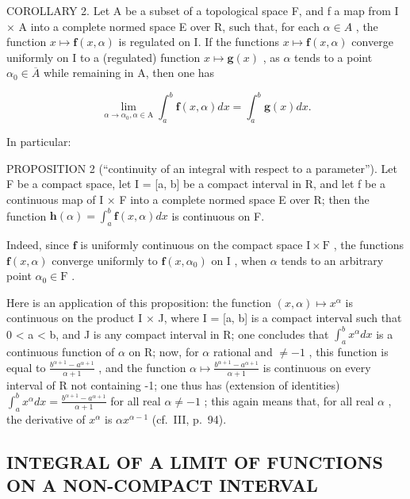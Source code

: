 COROLLARY 2. Let A be a subset of a topological space F, and f a map from I × A into a complete normed space E over R, such that, for each \(\alpha \in A\) , the function \(x \mapsto \mathbf{f}(x, \alpha)\) is regulated on I. If the functions \(x \mapsto \mathbf{f}(x, \alpha)\) converge uniformly on I to a (regulated) function \(x \mapsto \mathbf{g}(x)\) , as \(\alpha\) tends to a point \(\alpha_{0} \in \overline{A}\) while remaining in A, then one has

\[
\lim _ {\alpha \rightarrow \alpha_ {0}, \alpha \in \mathrm{A}} \int_ {a} ^ {b} \mathbf {f} (x, \alpha) d x = \int_ {a} ^ {b} \mathbf {g} (x) d x.\tag{3}
\]

In particular:

PROPOSITION 2 (``continuity of an integral with respect to a parameter''). Let F be a compact space, let I = {[}a, b{]} be a compact interval in R, and let f be a continuous map of I × F into a complete normed space E over R; then the function \(\mathbf{h}(\alpha) = \int_{a}^{b} \mathbf{f}(x, \alpha) dx\) is continuous on F.

Indeed, since \(\mathbf{f}\) is uniformly continuous on the compact space \(\mathrm{I} \times \mathrm{F}\) , the functions \(\mathbf{f}(x, \alpha)\) converge uniformly to \(\mathbf{f}(x, \alpha_0)\) on \(\mathrm{I}\) , when \(\alpha\) tends to an arbitrary point \(\alpha_0 \in \mathrm{F}\) .

Here is an application of this proposition: the function \((x, \alpha) \mapsto x^{\alpha}\) is continuous on the product I × J, where I = {[}a, b{]} is a compact interval such that 0 \textless{} a \textless{} b, and J is any compact interval in R; one concludes that \(\int_{a}^{b} x^{\alpha} dx\) is a continuous function of \(\alpha\) on R; now, for \(\alpha\) rational and \(\neq -1\) , this function is equal to \(\frac{b^{\alpha+1} - a^{\alpha+1}}{\alpha + 1}\) , and the function \(\alpha \mapsto \frac{b^{\alpha+1} - a^{\alpha+1}}{\alpha + 1}\) is continuous on every interval of R not containing -1; one thus has (extension of identities) \(\int_{a}^{b} x^{\alpha} dx = \frac{b^{\alpha+1} - a^{\alpha+1}}{\alpha + 1}\) for all real \(\alpha \neq -1\) ; this again means that, for all real \(\alpha\) , the derivative of \(x^{\alpha}\) is \(\alpha x^{\alpha-1}\) (cf.~III, p.~94).

\subsection{INTEGRAL OF A LIMIT OF FUNCTIONS ON A NON-COMPACT INTERVAL}

